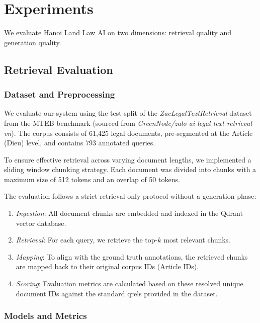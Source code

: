 \documentclass[letterpaper]{article} %
\begin{document}
\section{Experiments} \label{sec:experiments}

We evaluate Hanoi Land Law AI on two dimensions: retrieval quality and generation quality.

\subsection{Retrieval Evaluation}

\subsubsection{Dataset and Preprocessing}

We evaluate our system using the test split of the \textit{ZacLegalTextRetrieval} dataset from the MTEB benchmark (sourced from \textit{GreenNode/zalo-ai-legal-text-retrieval-vn}). The corpus consists of 61,425 legal documents, pre-segmented at the Article (Dieu) level, and contains 793 annotated queries.

To ensure effective retrieval across varying document lengths, we implemented a sliding window chunking strategy. Each document was divided into chunks with a maximum size of 512 tokens and an overlap of 50 tokens.

The evaluation follows a strict retrieval-only protocol without a generation phase:
\begin{enumerate}
    \item \textit{Ingestion}: All document chunks are embedded and indexed in the Qdrant vector database.
    \item \textit{Retrieval}: For each query, we retrieve the top-$k$ most relevant chunks.
    \item \textit{Mapping}: To align with the ground truth annotations, the retrieved chunks are mapped back to their original corpus IDs (Article IDs).
    \item \textit{Scoring}: Evaluation metrics are calculated based on these resolved unique document IDs against the standard qrels provided in the dataset.
\end{enumerate}

\subsubsection{Models and Metrics}
\end{document}
